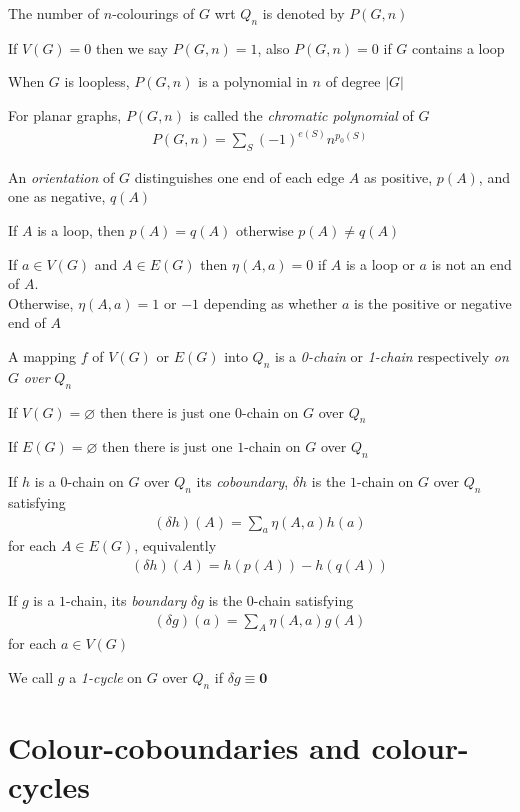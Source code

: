 \documentclass[a4paper]{article}
\begin{document}
The number of $n$-colourings of $G$ wrt $Q_n$ is denoted by $P(G,n)$

If $V(G) = 0$ then we say $P(G,n) = 1$, also $P(G,n) = 0$ if $G$ contains a loop

When $G$ is loopless, $P(G,n)$ is a polynomial in $n$ of degree $|G|$

For planar graphs, $P(G,n)$ is called the \textit{chromatic polynomial} of $G$
\begin{align}
P(G,n) = \sum_S (-1)^{e(S)} n^{p_0(S)} \tag{summing over spanning subgraphs $S$ of $G$}
\end{align}

An \textit{orientation} of $G$ distinguishes one end of each edge $A$ as positive, $p(A)$, and one as negative, $q(A)$

If $A$ is a loop, then $p(A) = q(A)$ otherwise $p(A) \neq q(A)$

If $a \in V(G)$ and $A \in E(G)$ then $\eta(A,a) = 0$ if $A$ is a loop or $a$ is not an end of $A$.\\
Otherwise, $\eta(A,a) = 1$ or $-1$ depending as whether $a$ is the positive or negative end of $A$

A mapping $f$ of $V(G)$ or $E(G)$ into $Q_n$ is a \textit{0-chain} or \textit{1-chain} respectively \textit{on} $G$ \textit{over} $Q_n$

If $V(G) = \varnothing$ then there is just one $0$-chain on $G$ over $Q_n$

If $E(G) = \varnothing$ then there is just one $1$-chain on $G$ over $Q_n$

If $h$ is a $0$-chain on $G$ over $Q_n$ its \textit{coboundary}, $\delta h$ is the $1$-chain on $G$ over $Q_n$ satisfying
\begin{align}
(\delta h)(A) = \sum_a \eta(A,a)h(a) \tag{2}
\end{align}
for each $A \in E(G)$, equivalently
\begin{align}
(\delta h)(A) = h(p(A)) - h(q(A)) \tag{2a}
\end{align}

If $g$ is a $1$-chain, its \textit{boundary} $\delta g$ is the $0$-chain satisfying
\begin{align}
(\delta g)(a) = \sum_A \eta(A,a)g(A) \tag{3}
\end{align}
for each $a \in V(G)$

We call $g$ a \textit{1-cycle} on $G$ over $Q_n$ if $\delta g \equiv \boldsymbol{0}$

\section{Colour-coboundaries and colour-cycles}
\end{document}
